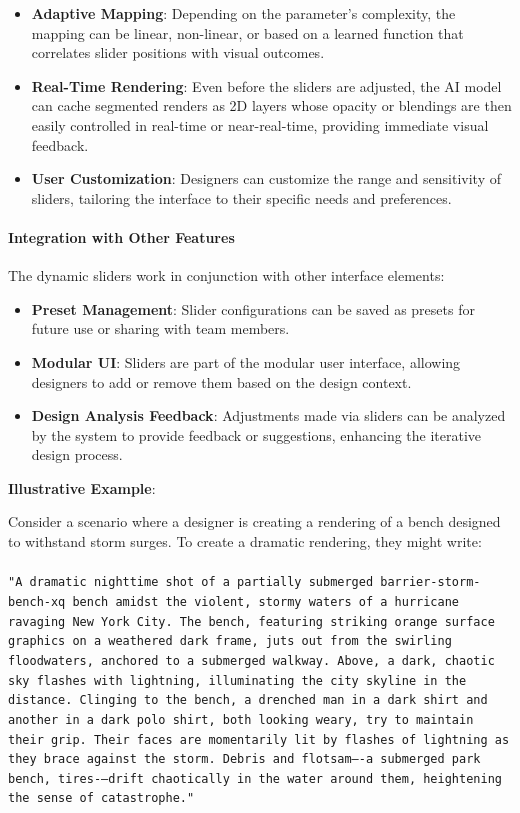 \documentclass[12pt]{article}
\begin{document}
    \begin{itemize}
        \item \textbf{Adaptive Mapping}: Depending on the parameter's complexity, the mapping can be linear, non-linear, or based on a learned function that correlates slider positions with visual outcomes.
        \item \textbf{Real-Time Rendering}: Even before the sliders are adjusted, the AI model can cache segmented renders as 2D layers whose opacity or blendings are then easily controlled in real-time or near-real-time, providing immediate visual feedback.
        \item \textbf{User Customization}: Designers can customize the range and sensitivity of sliders, tailoring the interface to their specific needs and preferences.
    \end{itemize}

\paragraph{Integration with Other Features} The dynamic sliders work in conjunction with other interface elements:

    \begin{itemize}
        \item \textbf{Preset Management}: Slider configurations can be saved as presets for future use or sharing with team members.
        \item \textbf{Modular UI}: Sliders are part of the modular user interface, allowing designers to add or remove them based on the design context.
        \item \textbf{Design Analysis Feedback}: Adjustments made via sliders can be analyzed by the system to provide feedback or suggestions, enhancing the iterative design process.
    \end{itemize}

\textbf{Illustrative Example}:

Consider a scenario where a designer is creating a rendering of a bench designed to withstand storm surges. To create a dramatic rendering, they might write:
\paragraph{}
\texttt{"A dramatic nighttime shot of a partially submerged barrier-storm-bench-xq bench amidst the violent, stormy waters of a hurricane ravaging New York City. The bench, featuring striking orange surface graphics on a weathered dark frame, juts out from the swirling floodwaters, anchored to a submerged walkway. Above, a dark, chaotic sky flashes with lightning, illuminating the city skyline in the distance. Clinging to the bench, a drenched man in a dark shirt and another in a dark polo shirt, both looking weary, try to maintain their grip. Their faces are momentarily lit by flashes of lightning as they brace against the storm. Debris and flotsam—-a submerged park bench, tires-—drift chaotically in the water around them, heightening the sense of catastrophe." }
\end{document}
